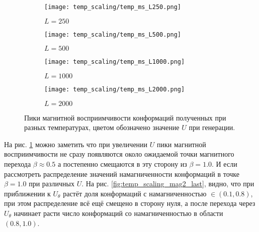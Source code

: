 \begin{figure}[ht]
	\centering
    \begin{subfigure}[t]{0.4\textwidth}
        \texttt{[image: temp\_scaling/temp\_ms\_L250.png]}
        \caption*{$L = 250$}
    \end{subfigure} 
    \begin{subfigure}[t]{0.4\textwidth}
        \texttt{[image: temp\_scaling/temp\_ms\_L500.png]}
        \caption*{$L = 500$}

    \end{subfigure}
    \begin{subfigure}[t]{0.4\textwidth}
        \texttt{[image: temp\_scaling/temp\_ms\_L1000.png]}
        \caption*{$L = 1000$}
    \end{subfigure}
    \begin{subfigure}[t]{0.4\textwidth}
        \texttt{[image: temp\_scaling/temp\_ms\_L2000.png]}
        \caption*{$L = 2000$}
    \end{subfigure}
	\caption{Пики магнитной восприимчивости конформаций полученных при разных температурах, цветом обозначено значение $U$ при генерации.}
	\label{fig:temp_scaling_ms}
\end{figure}


На рис. \ref{fig:temp_scaling_ms} можно заметить что при увеличении $U$ пики магнитной восприимчивости не сразу появляются около ожидаемой точки магнитного перехода $\beta \approx 0.5$ а постепенно смещаются в эту сторону из $\beta = 1.0$.
И если рассмотреть распределение значений намагниченности конформаций в точке $\beta = 1.0$ при различных $U$. На рис. \ref{fig:temp_scaling_mag2_last}, видно, что при приближении к $U_\theta$ растёт доля конформаций с намагниченностью $\in (0.1, 0.8)$, при этом распределение всё ещё смещено в сторону нуля, а после перехода через $U_\theta$ начинает расти число конформаций со намагниченностью в области $(0.8, 1.0)$.

